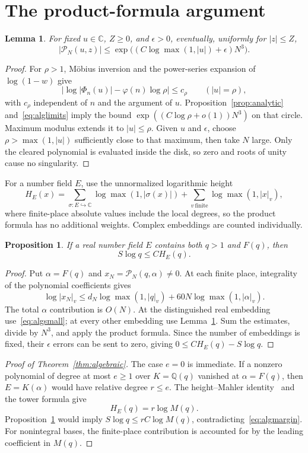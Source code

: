 \documentclass[12pt]{article}
\newtheorem{lemma}[theorem]{Lemma}
\newtheorem{proposition}[theorem]{Proposition}
\theoremstyle{remark}
\newcommand{\Q}{\mathbb Q}
\newcommand{\C}{\mathbb C}
\begin{document}
\section{The product-formula argument}\label{sec:algebraic}

\begin{lemma}\label{lem:disk}
For fixed $u\in\C$, $Z\geq0$, and $\epsilon>0$, eventually, uniformly for $|z|\leq Z$,
\[
|\mathcal P_N(u,z)|\leq
\exp\bigl((C\log\max(1,|u|)+\epsilon)N^3\bigr).
\]
\end{lemma}
\begin{proof}
For $\rho>1$, M\"obius inversion and the power-series expansion of $\log(1-w)$ give
\[
\bigl|\log|\Phi_n(u)|-\varphi(n)\log\rho\bigr|\leq c_\rho
\qquad(|u|=\rho),
\]
with $c_\rho$ independent of $n$ and the argument of $u$. Proposition~\ref{prop:analytic} and~\eqref{eq:alglimits} imply the bound $\exp((C\log\rho+o(1))N^3)$ on that circle. Maximum modulus extends it to $|u|\leq\rho$. Given $u$ and $\epsilon$, choose $\rho>\max(1,|u|)$ sufficiently close to that maximum, then take $N$ large. Only the cleared polynomial is evaluated inside the disk, so zero and roots of unity cause no singularity.
\end{proof}

For a number field $E$, use the unnormalized logarithmic height
\[
H_E(x)=\sum_{\sigma:E\hookrightarrow\C}\log\max(1,|\sigma(x)|)
+\sum_{v\ \text{finite}}\log\max(1,|x|_v),
\]
where finite-place absolute values include the local degrees, so the product formula has no additional weights. Complex embeddings are counted individually.

\begin{proposition}\label{prop:height}
If a real number field $E$ contains both $q>1$ and $F(q)$, then
\[
S\log q\leq CH_E(q).
\]
\end{proposition}
\begin{proof}
Put $\alpha=F(q)$ and $x_N=\mathcal P_N(q,\alpha)\ne0$. At each finite place, integrality of the polynomial coefficients gives
\[
\log|x_N|_v\leq d_N\log\max(1,|q|_v)
+60N\log\max(1,|\alpha|_v).
\]
The total $\alpha$ contribution is $O(N)$. At the distinguished real embedding use~\eqref{eq:algsmall}; at every other embedding use Lemma~\ref{lem:disk}. Sum the estimates, divide by $N^3$, and apply the product formula. Since the number of embeddings is fixed, their $\epsilon$ errors can be sent to zero, giving
$0\leq CH_E(q)-S\log q$.
\end{proof}

\begin{proof}[Proof of Theorem~\ref{thm:algebraic}]
The case $e=0$ is immediate. If a nonzero polynomial of degree at most $e\geq1$ over $K=\Q(q)$ vanished at $\alpha=F(q)$, then $E=K(\alpha)$ would have relative degree $r\leq e$. The height--Mahler identity~\cite[Proposition~1.6.6]{bombieri-gubler} and the tower formula give
\[
H_E(q)=r\log M(q).
\]
Proposition~\ref{prop:height} would imply
$S\log q\leq rC\log M(q)$, contradicting~\eqref{eq:algmargin}. For nonintegral bases, the finite-place contribution is accounted for by the leading coefficient in $M(q)$.
\end{proof}
\end{document}
